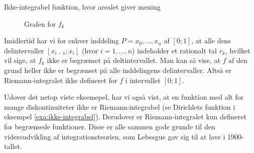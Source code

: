 \begin{example}[label=exa:arealmening]{Ikke-integrabel funktion, hvor arealet giver mening}{}
\begin{figure}[H]
\begin{center}
\end{center}
  \caption{Grafen for $f_k$}%
\label{fig:arealmening}
\end{figure}
Imidlertid har vi for enhver inddeling $P={x_0, \ldots , x_n}$ af $[0;1]$, at alle dens delintervaller $[x_{i-1};x_i]$ (hvor $i=1,\ldots , n$) indeholder et rationalt tal $r_k$, hvilket vil sige, at $f_k$ ikke er begrænset på deltintervallet. 
Man kan så vise, at $f$ af den grund heller ikke er begrænset på alle inddelingens delintervaller.
Altså er Riemann-integralet ikke defineret for $f$ i intervallet $[0;1]$.
\end{example}

Udover det netop viste eksemepel, har vi også vist, at en funktion med alt for mange diskontinuiteter ikke er Riemann-integrabel (se Dirichlets funktion i eksempel \ref{exa:ikke-integrabel}).
Derudover er Riemann-integralet kun defineret for begrænsede funktioner.
Disse er alle sammen gode grunde til den videreudvikling af integrationsteorien, som Lebesgue gav sig til at lave i 1900-tallet.

